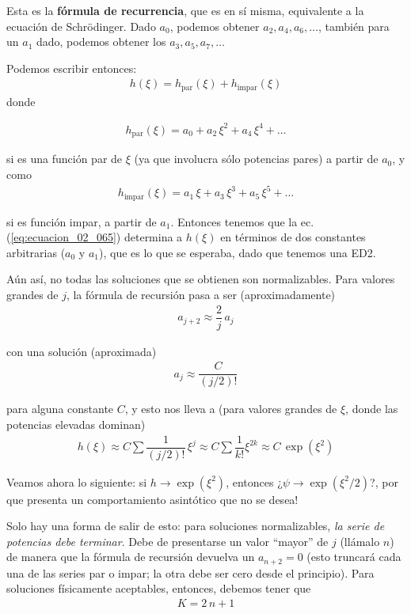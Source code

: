 Esta es la \textbf{fórmula de recurrencia}, que es en sí misma, equivalente a la ecuación de Schrödinger. Dado $a_{0}$, podemos obtener $a_{2}, a_{4}, a_{6}, \ldots$, también para un $a_{1}$ dado, podemos obtener los $a_{3}, a_{5}, a_{7}, \ldots$
\par
Podemos escribir entonces:
\begin{align}
h (\xi) = h_{\text{par}} (\xi) + h_{\text{impar}} (\xi)
\label{eq:ecuacion_02_066}
\end{align}
donde

\begin{align*}
h_{\text{par}} (\xi) = a_{0} + a_{2} \, \xi^{2} + a_{4} \, \xi^{4} + \ldots
\end{align*}

si es una función par de $\xi$ (ya que involucra sólo potencias pares) a partir de $a_{0}$, y como
\begin{align*}
h_{\text{impar}} (\xi) = a_{1} \, \xi + a_{3} \, \xi^{3} + a_{5} \, \xi^{5} + \ldots
\end{align*}

si es función impar, a partir de $a_{1}$. Entonces tenemos que la ec. (\ref{eq:ecuacion_02_065}) determina a $h(\xi)$ en términos de dos constantes arbitrarias ($a_{0}$ y $a_{1}$), que es lo que se esperaba, dado que tenemos una ED2.
\par
Aún así, no todas las soluciones que se obtienen son normalizables. Para valores grandes de $j$, la fórmula de recursión pasa a ser (aproximadamente)
\begin{align*}
a_{j+2} \approx \dfrac{2}{j} \, a_{j}
\end{align*}

con una solución (aproximada)
\begin{align*}
a_{j} \approx \dfrac{C}{(j/2)!}
\end{align*}

para alguna constante $C$, y esto nos lleva a (para valores grandes de $\xi$, donde las potencias elevadas dominan)
\begin{align*}
h (\xi) \approx C \sum \dfrac{1}{(j/2)!} \, \xi^{j} \approx C \sum \dfrac{1}{k!} \xi^{2 k} \approx C \, \exp \left( \xi^{2} \right)
\end{align*}

Veamos ahora lo siguiente: si $h \to \exp \left( \xi^{2} \right)$, entonces ¿$\psi \to \exp \left( \xi^{2}/2 \right)$?, por que presenta un comportamiento asintótico que no se desea!
\par
Solo hay una forma de salir de esto: para soluciones normalizables, \textit{la serie de potencias debe terminar}. Debe de presentarse un valor \enquote{mayor} de $j$ (llámalo $n$) de manera que la fórmula de recursión devuelva un $a_{n+2} = 0$ (esto truncará cada una de las series par o impar; la otra debe ser cero desde el principio). Para soluciones físicamente aceptables, entonces, debemos tener que
\begin{align*}
K = 2 \, n + 1
\end{align*}

